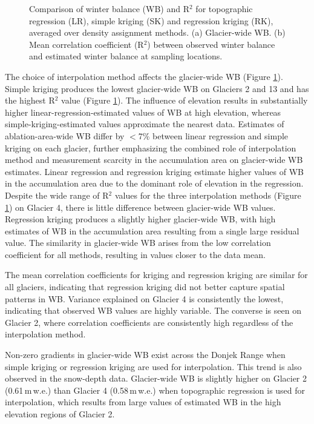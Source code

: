 \documentclass{sfuthesis}
\begin{document}
{\begin{figure}
    \caption[Comparison of winter balance (WB) and R$^2$ for topographic regression (LR), simple kriging (SK) and regression kriging (RK), averaged over density assignment methods]{Comparison of winter balance (WB) and R$^2$ for topographic regression (LR), simple kriging (SK) and regression kriging (RK), averaged over density assignment methods. (a) Glacier-wide WB.  (b) Mean correlation coefficient (R$^2$) between observed winter balance and estimated winter balance at sampling locations.}
\label{fig:InterpMethod_mean}
\end{figure}


The choice of interpolation method affects the glacier-wide WB (Figure \ref{fig:InterpMethod_mean}). Simple kriging produces the lowest glacier-wide WB on Glaciers 2 and 13 and has the highest R$^2$ value (Figure \ref{fig:InterpMethod_mean}). The influence of elevation results in substantially higher linear-regression-estimated values of WB at high elevation, whereas simple-kriging-estimated values approximate the nearest data. Estimates of ablation-area-wide WB differ by $<$7\% between linear regression and simple kriging on each glacier, further emphasizing the combined role of interpolation method and measurement scarcity in the accumulation area on glacier-wide WB estimates. Linear regression and regression kriging estimate higher values of WB in the accumulation area due to the dominant role of elevation in the regression. Despite the wide range of R$^2$ values for the three interpolation methods (Figure \ref{fig:InterpMethod_mean}) on Glacier 4, there is little difference between glacier-wide WB values. Regression kriging produces a slightly higher glacier-wide WB, with high estimates of WB in the accumulation area resulting from a single large residual value. The similarity in glacier-wide WB arises from the low correlation coefficient for all methods, resulting in values closer to the data mean. 

The mean correlation coefficients for kriging and regression kriging are similar for all glaciers, indicating that regression kriging did not better capture spatial patterns in WB. Variance explained on Glacier 4 is consistently the lowest, indicating that observed WB values are highly variable. The converse is seen on Glacier 2, where correlation coefficients are consistently high regardless of the interpolation method.

Non-zero gradients in glacier-wide WB exist across the Donjek Range when simple kriging or regression kriging are used for interpolation. This trend is also observed in the snow-depth data. Glacier-wide WB is slightly higher on Glacier 2 (0.61\,m\,w.e.) than Glacier 4 (0.58\,m\,w.e.) when topographic regression is used for interpolation, which results from large values of estimated WB in the high elevation regions of Glacier 2.

}
\end{document}

